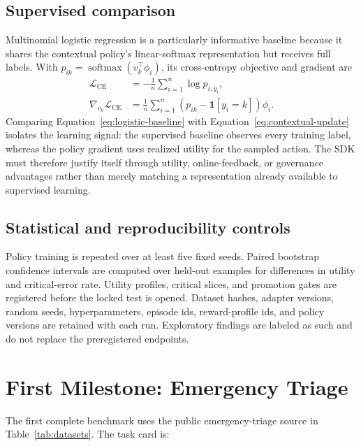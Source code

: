 \documentclass[conference]{IEEEtran}
\begin{document}
\subsection{Supervised comparison}

Multinomial logistic regression is a particularly informative
baseline because it shares the contextual policy's linear-softmax
representation but receives full labels. With
$p_{ik}=\operatorname{softmax}(v_k^\top\phi_i)$, its cross-entropy
objective and gradient are
\begin{equation}
\begin{aligned}
\mathcal{L}_{\mathrm{CE}}
&=-\frac{1}{n}\sum_{i=1}^{n}\log p_{i,y_i},\\
\nabla_{v_k}\mathcal{L}_{\mathrm{CE}}
&=\frac{1}{n}\sum_{i=1}^{n}
(p_{ik}-\mathbf{1}[y_i=k])\phi_i.
\end{aligned}
\label{eq:logistic-baseline}
\end{equation}
Comparing Equation~\ref{eq:logistic-baseline} with
Equation~\ref{eq:contextual-update} isolates the learning signal:
the supervised baseline observes every training label, whereas the
policy gradient uses realized utility for the sampled action. The SDK
must therefore justify itself through utility, online-feedback, or
governance advantages rather than merely matching a representation
already available to supervised learning.

\subsection{Statistical and reproducibility controls}

Policy training is repeated over at least five fixed seeds. Paired
bootstrap confidence intervals are computed over held-out examples
for differences in utility and critical-error rate. Utility profiles,
critical slices, and promotion gates are registered before the locked
test is opened. Dataset hashes, adapter versions, random seeds,
hyperparameters, episode ids, reward-profile ids, and policy versions
are retained with each run. Exploratory findings are labeled as such
and do not replace the preregistered endpoints.

\section{First Milestone: Emergency Triage}
\label{sec:triage}

The first complete benchmark uses the public emergency-triage source
in Table~\ref{tab:datasets}. The task card is:
\end{document}
